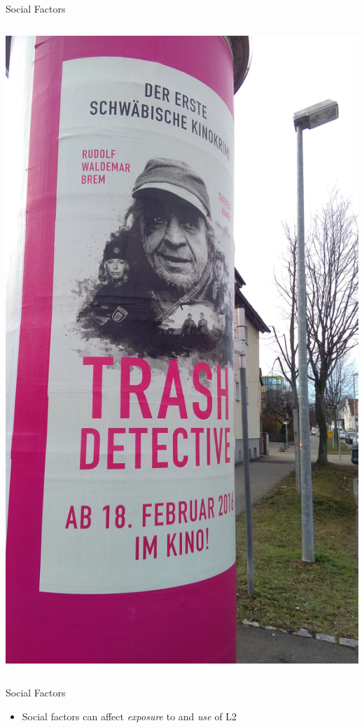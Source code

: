 \documentclass{beamer}
\begin{document}
\begin{frame}{Social Factors}
\begin{columns}
      \includegraphics[scale=0.05]{trash_detective.jpg}
  \end{columns}
\end{frame}

\begin{frame}{Social Factors}
  \begin{itemize}
    \item Social factors can affect \emph{exposure} to and \emph{use} of L2
  \end{itemize}
\end{frame}
\end{document}
